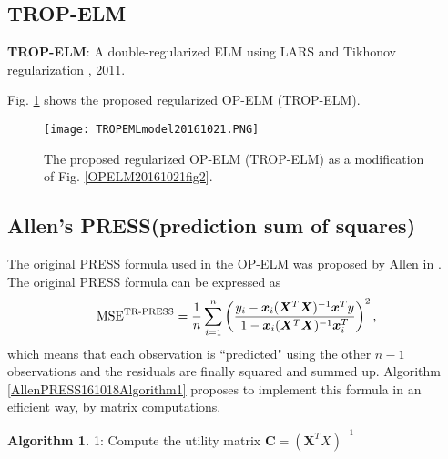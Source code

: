 \subsection{TROP-ELM}
\textbf{TROP-ELM}: A double-regularized ELM using LARS and Tikhonov regularization \cite{MichevanHeeswijk2011-30641}, 2011.

Fig. \ref{TROPEMLmodel20161021fig2} shows the proposed regularized OP-ELM (TROP-ELM).
\begin{figure}[H]
\begin{center}
\texttt{[image: TROPEMLmodel20161021.PNG]}
\end{center}
\caption{The proposed regularized OP-ELM (TROP-ELM) as a modification of Fig. \ref{OPELM20161021fig2}.}
\label{TROPEMLmodel20161021fig2}
\end{figure}
\subsection{Allen's PRESS(prediction sum of squares)}
The original PRESS formula used in the OP-ELM was proposed by Allen in \cite{MADavid1972}. The original PRESS formula can be expressed as
\begin{align}
  \textup{MSE}^{\textup{TR-PRESS}}=\frac 1 n \sum_{i=1}^n \left( \frac{y_i-\bm x_i(\bm X^T \bm X)^{-1}\bm x^T y  }
       {1-\bm x_i(\bm X^T \bm X)^{-1}\bm x_i^T}\right)^2,
\end{align}
which means that each observation is ``predicted" using the other $n-1$ observations and the residuals are finally squared and summed up. Algorithm \ref{AllenPRESS161018Algorithm1} proposes to implement this formula in an efficient way, by matrix computations.

\textbf{Algorithm 1.}
1: Compute the utility matrix $\bm C= (\bm X^T X)^{-1}$


